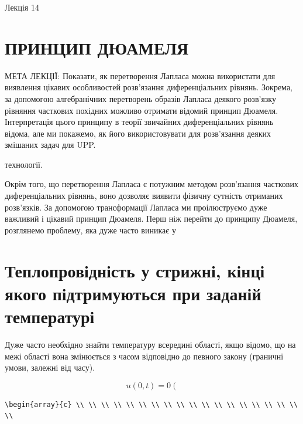 \documentclass[
  ukrainian,
]{article}
\begin{document}
Лекція 14

\section{ПРИНЦИП
ДЮАМЕЛЯ}\label{ux43fux440ux438ux43dux446ux438ux43f-ux434ux44eux430ux43cux435ux43bux44f}

МЕТА ЛЕКЦІЇ: Показати, як перетворення Лапласа можна використати для
виявлення цікавих особливостей розв'язання диференціальних рівнянь.
Зокрема, за допомогою алгебранічних перетворень образів Лапласа деякого
розв'язку рівняння часткових похідних можливо отримати відомий принцип
Дюамеля. Інтерпретація цього принципу в теорії звичайних диференціальних
рівнянь відома, але ми покажемо, як його використовувати для розв'язання
деяких змішаних задач для UPP.

технології.

Окрім того, що перетворення Лапласа є потужним методом розв'язання
часткових диференціальних рівнянь, воно дозволяє виявити фізичну
сутність отриманих розв'язків. За допомогою трансформації Лапласа ми
проілюструємо дуже важливий і цікавий принцип Дюамеля. Перш ніж перейти
до принципу Дюамеля, розглянемо проблему, яка дуже часто виникає у

\section{Теплопровідність у стрижні, кінці якого підтримуються при
заданій
температурі}\label{ux442ux435ux43fux43bux43eux43fux440ux43eux432ux456ux434ux43dux456ux441ux442ux44c-ux443-ux441ux442ux440ux438ux436ux43dux456-ux43aux456ux43dux446ux456-ux44fux43aux43eux433ux43e-ux43fux456ux434ux442ux440ux438ux43cux443ux44eux442ux44cux441ux44f-ux43fux440ux438-ux437ux430ux434ux430ux43dux456ux439-ux442ux435ux43cux43fux435ux440ux430ux442ux443ux440ux456}

Дуже часто необхідно знайти температуру всередині області, якщо відомо,
що на межі області вона змінюється з часом відповідно до певного закону
(граничні умови, залежні від часу).

\[
u(0,t)=0 \left(
\]

\begin{verbatim}
\begin{array}{c} \\ \\ \\ \\ \\ \\ \\ \\ \\ \\ \\ \\ \\ \\ \\ \\ \\ \\ \\
\end{verbatim}
\end{document}
